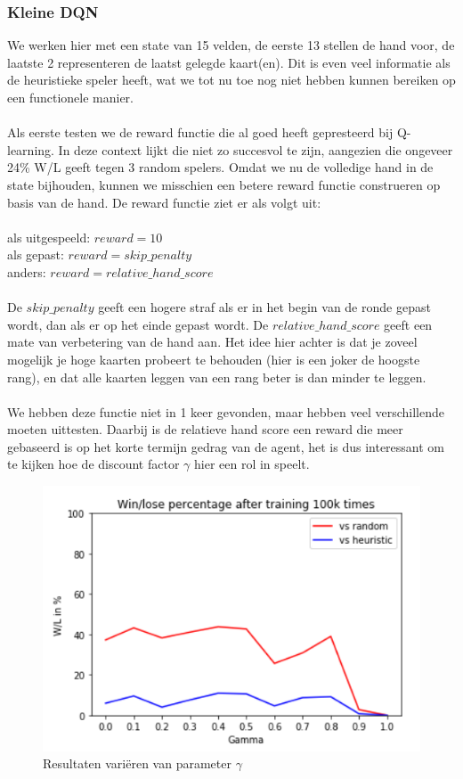 \documentclass[11pt]{article}
\begin{document}
\subsubsection{Kleine DQN}
We werken hier met een state van 15 velden, de eerste 13 stellen de hand voor, de laatste 2 representeren de laatst gelegde kaart(en). Dit is even veel informatie als de heuristieke speler heeft, wat we tot nu toe nog niet hebben kunnen bereiken op een functionele manier.\\\\
Als eerste testen we de reward functie die al goed heeft gepresteerd bij Q-learning. In deze context lijkt die niet zo succesvol te zijn, aangezien die ongeveer 24\% W/L geeft tegen 3 random spelers. Omdat we nu de volledige hand in de state bijhouden, kunnen we misschien een betere reward functie construeren op basis van de hand. De reward functie ziet er als volgt uit:\\\\
\indent als uitgespeeld: $reward = 10$\\
\indent als gepast: $reward = skip\_penalty$\\
\indent anders: $reward = relative\_hand\_score$\\\\
De $skip\_penalty$ geeft een hogere straf als er in het begin van de ronde gepast wordt, dan als er op het einde gepast wordt. De $relative\_hand\_score$ geeft een mate van verbetering van de hand aan. Het idee hier achter is dat je zoveel mogelijk je hoge kaarten probeert te behouden (hier is een joker de hoogste rang), en dat alle kaarten leggen van een rang beter is dan minder te leggen. \\\\
We hebben deze functie niet in 1 keer gevonden, maar hebben veel verschillende moeten uittesten. Daarbij is de relatieve hand score een reward die meer gebaseerd is op het korte termijn gedrag van de agent, het is dus interessant om te kijken hoe de discount factor $\gamma$ hier een rol in speelt.
\begin{figure}[H]
\centering
\includegraphics[scale=0.38]{images/gamma-iteratie-dqn.png}
\caption{Resultaten variëren van parameter $\gamma$}
\label{fig:gamma_iteratie_small_dqn}
\end{figure}
\end{document}
